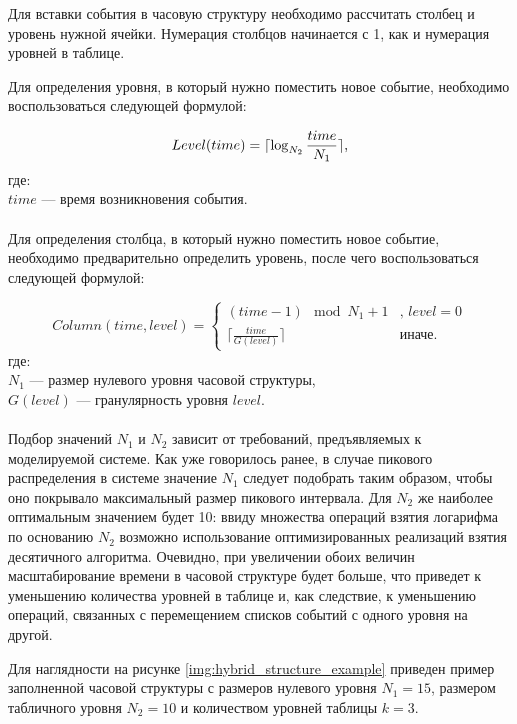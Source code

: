 Для вставки события в часовую структуру необходимо рассчитать столбец и уровень нужной ячейки. Нумерация столбцов начинается с 1, как и нумерация уровней в таблице.

Для определения уровня, в который нужно поместить новое событие, необходимо воспользоваться следующей формулой:

\begin{equation}
	Level(time) =  \lceil \log_{N_2} \frac{time}{N_1} \rceil \text{,} \\
\end{equation}
где: \\
$time$ --- время возникновения события. \\ \\

Для определения столбца, в который нужно поместить новое событие, необходимо предварительно определить уровень, после чего воспользоваться следующей формулой:

\begin{equation}
	Column(time, level) = 
	\begin{cases}
		(time - 1) \mod N_1 + 1 & \text{, $level = 0$} \\
		\lceil \frac{time}{G(level)} \rceil & \text{иначе}.
	\end{cases}
	\label{eq:column}
\end{equation}
где: \\
$N_1$ --- размер нулевого уровня часовой структуры, \\
$G(level)$ --- гранулярность уровня $level$. \\ \\

Подбор значений $N_1$ и $N_2$ зависит от требований, предъявляемых к моделируемой системе. Как уже говорилось ранее, в случае пикового распределения в системе значение $N_1$ следует подобрать таким образом, чтобы оно покрывало максимальный размер пикового интервала. Для $N_2$ же наиболее оптимальным значением будет 10: ввиду множества операций взятия логарифма по основанию $N_2$ возможно использование оптимизированных реализаций взятия десятичного алгоритма. Очевидно, при увеличении обоих величин масштабирование времени в часовой структуре будет больше, что приведет к уменьшению количества уровней в таблице и, как следствие, к уменьшению операций, связанных с перемещением списков событий с одного уровня на другой.


Для наглядности на рисунке \ref{img:hybrid_structure_example} приведен пример заполненной часовой структуры с размеров нулевого уровня $N_1 = 15$, размером табличного уровня $N_2 = 10$ и количеством уровней таблицы $k = 3$.

